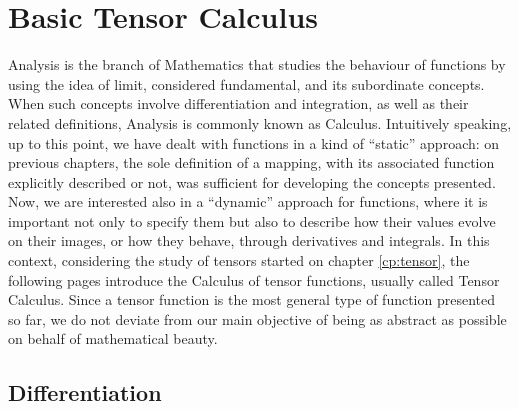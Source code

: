 
\chapter{Basic Tensor Calculus}

Analysis is the branch of Mathematics that studies the behaviour of functions by using the idea of limit, considered fundamental, and its subordinate concepts. When such concepts involve  differentiation and integration, as well as their related definitions, Analysis is commonly known as Calculus. Intuitively speaking, up to this point, we have dealt with functions in a kind of ``static'' approach: on previous chapters, the sole definition of a mapping, with its associated function explicitly described or not, was sufficient for developing the concepts presented. Now, we are interested also in a ``dynamic'' approach for functions, where it is important not only to specify them but also to describe how their values evolve on their images, or how they behave, through derivatives and integrals. In this context, considering the study of tensors started on chapter \ref{cp:tensor}, the following pages introduce the Calculus of tensor functions, usually called Tensor Calculus. Since a tensor function is the most general type of function presented so far, we do not deviate from our main objective of being as abstract as possible on behalf of mathematical beauty.  



\section{Differentiation}


